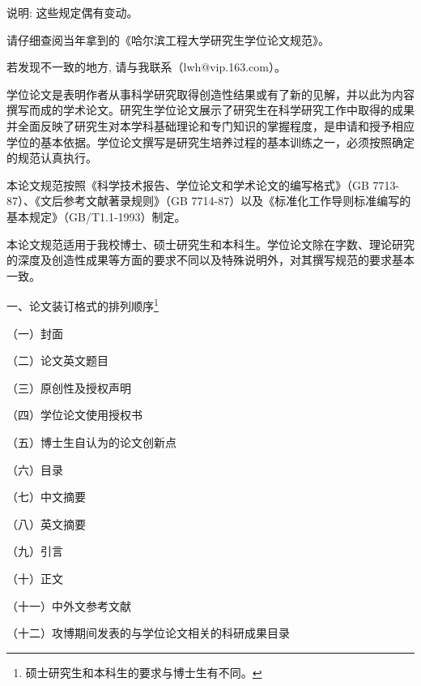 
%
%
%


 \hei 说明:
 \kai
 这些规定偶有变动。

 请仔细查阅当年拿到的《哈尔滨工程大学研究生学位论文规范》。

 若发现不一致的地方, 请与我联系（lwh@vip.163.com）。

\vspace*{0.5cm}

\song
学位论文是表明作者从事科学研究取得创造性结果或有了新的见解，并以此为内容撰写而成的学术论文。研究生学位论文展示了研究生在科学研究工作中取得的成果并全面反映了研究生对本学科基础理论和专门知识的掌握程度，是申请和授予相应学位的基本依据。学位论文撰写是研究生培养过程的基本训练之一，必须按照确定的规范认真执行。

本论文规范按照《科学技术报告、学位论文和学术论文的编写格式》（GB 7713-87）、《文后参考文献著录规则》（GB 7714-87）以及《标准化工作导则标准编写的基本规定》（GB/T1.1-1993）制定。

本论文规范适用于我校博士、硕士研究生和本科生。学位论文除在字数、理论研究的深度及创造性成果等方面的要求不同以及特殊说明外，对其撰写规范的要求基本一致。


{\hei 一、论文装订格式的排列顺序\footnote{硕士研究生和本科生的要求与博士生有不同。}}

（一）封面

（二）论文英文题目

（三）原创性及授权声明

（四）学位论文使用授权书

（五）博士生自认为的论文创新点

（六）目录

（七）中文摘要

（八）英文摘要

（九）引言

（十）正文

（十一）中外文参考文献

（十二）攻博期间发表的与学位论文相关的科研成果目录

